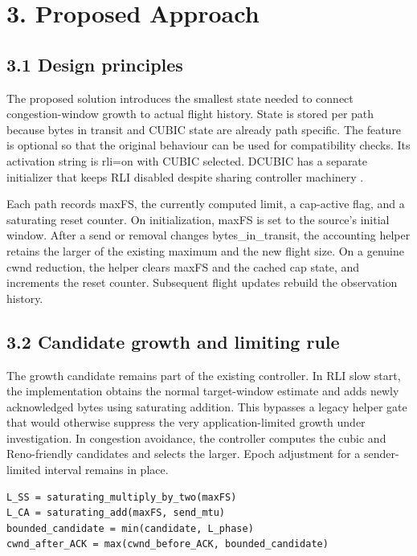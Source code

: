 \clearpage
\section*{3. Proposed Approach}
\label{sec:approach}
\subsection*{3.1 Design principles}

The proposed solution introduces the smallest state needed to connect congestion-window growth to actual flight history. State is stored per path because bytes in transit and CUBIC state are already path specific. The feature is optional so that the original behaviour can be used for compatibility checks. Its activation string is rli=on with CUBIC selected. DCUBIC has a separate initializer that keeps RLI disabled despite sharing controller machinery \cite{ref12}.


Each path records maxFS, the currently computed limit, a cap-active flag, and a saturating reset counter. On initialization, maxFS is set to the source's initial window. After a send or removal changes bytes\_in\_transit, the accounting helper retains the larger of the existing maximum and the new flight size. On a genuine cwnd reduction, the helper clears maxFS and the cached cap state, and increments the reset counter. Subsequent flight updates rebuild the observation history.


\subsection*{3.2 Candidate growth and limiting rule}

The growth candidate remains part of the existing controller. In RLI slow start, the implementation obtains the normal target-window estimate and adds newly acknowledged bytes using saturating addition. This bypasses a legacy helper gate that would otherwise suppress the very application-limited growth under investigation. In congestion avoidance, the controller computes the cubic and Reno-friendly candidates and selects the larger. Epoch adjustment for a sender-limited interval remains in place.



\begingroup\footnotesize
\begin{verbatim}
L_SS = saturating_multiply_by_two(maxFS)
L_CA = saturating_add(maxFS, send_mtu)
bounded_candidate = min(candidate, L_phase)
cwnd_after_ACK = max(cwnd_before_ACK, bounded_candidate)
\end{verbatim}
\endgroup

